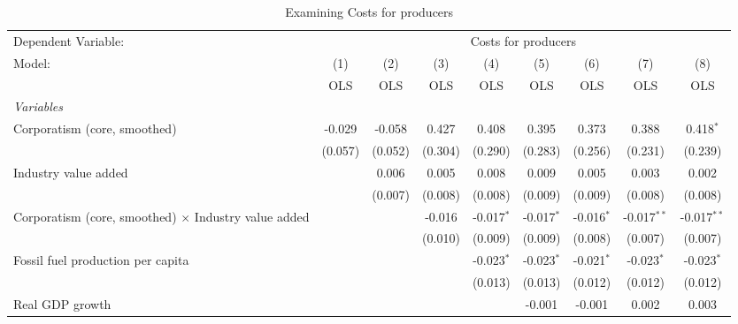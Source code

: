 
\begin{table}[htbp]
   \caption{Examining Costs for producers}
   \centering
   \begin{tabular}{lcccccccc}
      \toprule
      Dependent Variable: & \multicolumn{8}{c}{Costs for producers}\\
      Model:                                                      & (1)     & (2)     & (3)     & (4)          & (5)          & (6)          & (7)           & (8)\\  
                                                                  &  OLS    & OLS     & OLS     & OLS          & OLS          & OLS          & OLS           & OLS\\  
      \midrule
      \emph{Variables}\\
      Corporatism (core, smoothed)                                & -0.029  & -0.058  & 0.427   & 0.408        & 0.395        & 0.373        & 0.388         & 0.418$^{*}$\\   
                                                                  & (0.057) & (0.052) & (0.304) & (0.290)      & (0.283)      & (0.256)      & (0.231)       & (0.239)\\   
      Industry value added                                        &         & 0.006   & 0.005   & 0.008        & 0.009        & 0.005        & 0.003         & 0.002\\   
                                                                  &         & (0.007) & (0.008) & (0.008)      & (0.009)      & (0.009)      & (0.008)       & (0.008)\\   
      Corporatism (core, smoothed) $\times$ Industry value added  &         &         & -0.016  & -0.017$^{*}$ & -0.017$^{*}$ & -0.016$^{*}$ & -0.017$^{**}$ & -0.017$^{**}$\\   
                                                                  &         &         & (0.010) & (0.009)      & (0.009)      & (0.008)      & (0.007)       & (0.007)\\   
      Fossil fuel production per capita                           &         &         &         & -0.023$^{*}$ & -0.023$^{*}$ & -0.021$^{*}$ & -0.023$^{*}$  & -0.023$^{*}$\\   
                                                                  &         &         &         & (0.013)      & (0.013)      & (0.012)      & (0.012)       & (0.012)\\   
      Real GDP growth                                             &         &         &         &              & -0.001       & -0.001       & 0.002         & 0.003\\   

\end{tabular}
\end{table}
